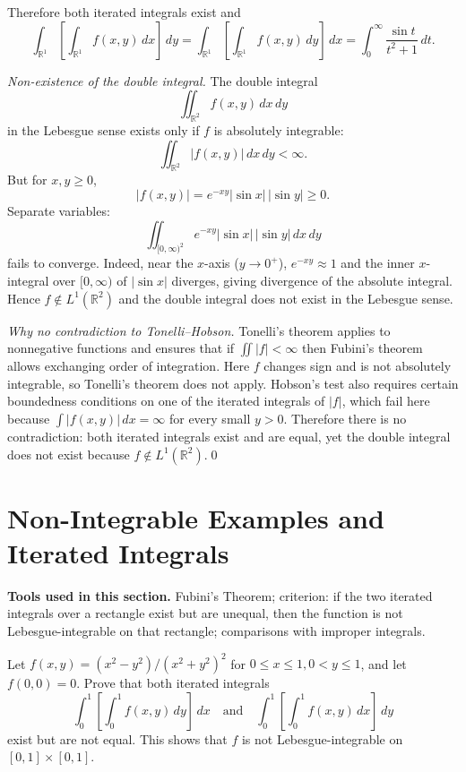 Therefore both iterated integrals exist and
\[
\int_{\mathbb{R}^1} \left[ \int_{\mathbb{R}^1} f(x, y) \, dx \right] \, dy
=
\int_{\mathbb{R}^1} \left[ \int_{\mathbb{R}^1} f(x, y) \, dy \right] \, dx
= \int_0^\infty \frac{\sin t}{t^2+1} \, dt.
\]

\emph{Non-existence of the double integral.}
The double integral
\[
\iint_{\mathbb{R}^2} f(x,y) \, dx \, dy
\]
in the Lebesgue sense exists only if \(f\) is absolutely integrable:
\[
\iint_{\mathbb{R}^2} |f(x,y)| \, dx \, dy < \infty.
\]
But for \(x,y \ge 0\),
\[
|f(x,y)| = e^{-xy} |\sin x| \, |\sin y| \ge 0.
\]
Separate variables:
\[
\iint_{[0,\infty)^2} e^{-xy} |\sin x|\, |\sin y| \, dx\, dy
\]
fails to converge. Indeed, near the \(x\)-axis (\(y \to 0^+\)), \(e^{-xy} \approx 1\) and the inner \(x\)-integral over \([0,\infty)\) of \(|\sin x|\) diverges, giving divergence of the absolute integral.  
Hence \(f \notin L^1(\mathbb{R}^2)\) and the double integral does not exist in the Lebesgue sense.

\emph{Why no contradiction to Tonelli--Hobson.}
Tonelli's theorem applies to nonnegative functions and ensures that if \(\iint |f| < \infty\) then Fubini's theorem allows exchanging order of integration.  
Here \(f\) changes sign and is not absolutely integrable, so Tonelli's theorem does not apply.  
Hobson's test also requires certain boundedness conditions on one of the iterated integrals of \(|f|\), which fail here because \(\int |f(x,y)|\, dx = \infty\) for every small \(y > 0\).  
Therefore there is no contradiction: both iterated integrals exist and are equal, yet the double integral does not exist because \(f \notin L^1(\mathbb{R}^2)\).\qed
\section{Non-Integrable Examples and Iterated Integrals}

\noindent\textbf{Tools used in this section.} Fubini's Theorem; criterion: if the two iterated integrals over a rectangle exist but are unequal, then the function is not Lebesgue-integrable on that rectangle; comparisons with improper integrals.



\begin{problembox}
Let \( f(x, y) = (x^2 - y^2)/(x^2 + y^2)^2 \) for \( 0 \leq x \leq 1, 0 < y \leq 1 \), and let \( f(0, 0) = 0 \). Prove that both iterated integrals
\[
\int_0^1 \left[ \int_0^1 f(x, y) \, dy \right] \, dx \quad \text{and} \quad \int_0^1 \left[ \int_0^1 f(x, y) \, dx \right] \, dy
\]
exist but are not equal. This shows that \( f \) is not Lebesgue-integrable on \([0, 1] \times [0, 1]\).
\end{problembox}

